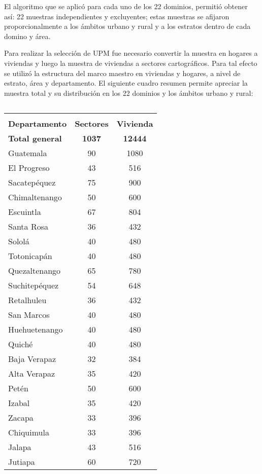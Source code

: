 \begin{itemize}
	
	El algoritmo que se aplicó para cada uno de los 22 dominios, permitió obtener así: 22 muestras independientes y excluyentes; estas muestras se afijaron proporcionalmente a los ámbitos urbano y rural y a los estratos dentro de cada domino y área. 
	
	Para realizar la selección de UPM fue necesario convertir la muestra en hogares a viviendas y luego la muestra de viviendas a sectores cartográficos. Para tal efecto se utilizó la estructura del marco maestro en viviendas y hogares, a nivel de estrato, área y departamento. El siguiente cuadro resumen permite apreciar la muestra total y su distribución en los 22 dominios y los ámbitos urbano y rural:
		
	$\,$\\[-0.7cm]
	\begin{center}
		\begin{tabular}{lcc}
			\hline &&\\[-0.56cm]
			\multicolumn{1}{c}{\multirow{2}[0]{*}{\textbf{Departamento}}}  & \multirow{2}[0]{*}{\textbf{Sectores}} & \multirow{2}[0]{*}{\textbf{Vivienda}} \\[0.22cm]
			\hline
			&&\\[-0.34cm]
			
			\textbf{Total general}	&	\textbf{1037}	&	\textbf{12444}	\\
			Guatemala	&	90	&	1080	\\
			El Progreso	&	43	&	516	\\
			Sacatepéquez	&	75	&	900	\\
			Chimaltenango	&	50	&	600	\\
			Escuintla	&	67	&	804	\\
			Santa Rosa	&	36	&	432	\\
			Sololá	&	40	&	480	\\
			Totonicapán	&	40	&	480	\\
			Quezaltenango	&	65	&	780	\\
			Suchitepéquez	&	54	&	648	\\
			Retalhuleu	&	36	&	432	\\
			San Marcos	&	40	&	480	\\
			Huehuetenango	&	40	&	480	\\
			Quiché	&	40	&	480	\\
			Baja Verapaz	&	32	&	384	\\
			Alta Verapaz 	&	35	&	420	\\
			Petén	&	50	&	600	\\
			Izabal	&	35	&	420	\\
			Zacapa	&	33	&	396	\\
			Chiquimula	&	33	&	396	\\
			Jalapa	&	43	&	516	\\
			Jutiapa	&	60	&	720	\\[0.05cm]
			\hline
		\end{tabular}
	\end{center}
	

\end{itemize}
